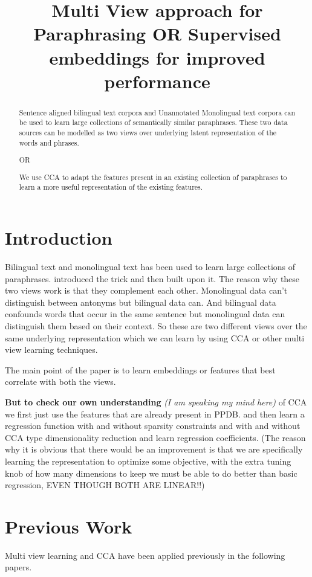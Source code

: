 \documentclass[11pt]{article}
\title{Multi View approach for Paraphrasing OR Supervised embeddings
  for improved performance}
\date{}
\begin{document}
\maketitle
\begin{abstract}
  Sentence aligned bilingual text corpora and Unannotated Monolingual
  text corpora can be used to learn large collections of semantically
  similar paraphrases. These two data sources can be modelled as two
  views over underlying latent representation of the words and
  phrases.

  OR
  
  We use CCA to adapt the features present in an existing collection
  of paraphrases to learn a more useful representation of the existing features.
\end{abstract}

\section{Introduction}
Bilingual text and monolingual text has been used to learn large
collections of paraphrases. \cite{ccb2005} introduced the trick and
then \cite{PPDB} built upon it. The reason why these two views work is
that they complement each other. Monolingual data can't distinguish
between antonyms but bilingual data can. And bilingual data confounds
words that occur in the same sentence but monolingual data can
distinguish them based on their context. So these are two different
views over the same underlying representation which we can learn by
using CCA or other multi view learning techniques.

The main point of the paper is to learn embeddings or features
that best correlate with both the views. 

\textbf{But to check our own understanding} \textit{(I am speaking
  my mind here)} of CCA we first just use the
features that are already present in PPDB. and then learn a regression
function with and without sparsity constraints and with and without
CCA type dimensionality reduction and learn regression
coefficients. (The reason why it is obvious that there would be an
improvement is that we are specifically learning the representation to
optimize some objective, with the extra tuning knob of how many
dimensions to keep we must be able to do better than basic regression,
EVEN THOUGH BOTH ARE LINEAR!!)

\section{Previous Work}
Multi view learning and CCA have been applied previously in the following
papers.
\end{document}
